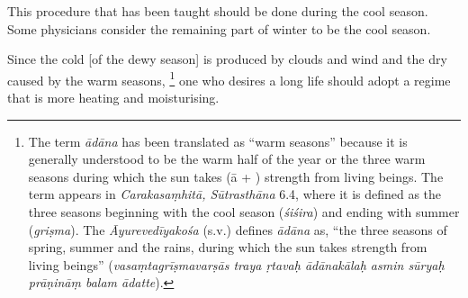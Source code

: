 \begin{translation}
\item[36] %
This procedure %
that has been taught should be done during the cool season. %
Some physicians consider the remaining part of winter to be the cool season. 

\item[37] %

Since the cold [of the dewy season] is produced by clouds and wind and the dry caused by the warm seasons,%
	\footnote{The term \emph{ādāna} has been translated as ``warm 
	seasons'' because it is generally understood to be the warm half of the 
	year or the three warm seasons during which the sun takes (ā +  
	) strength from living beings. The term appears in 
	\emph{Carakasaṃhitā, Sūtrasthāna} 6.4, where it is defined as the three 
	seasons beginning with the cool season (\emph{śiśira}) and ending with 
	summer (\emph{griṣma}). The  \emph{Āyurevedīyakośa} (s.v.) defines 
	\emph{ādāna} as, ``the three seasons of spring, summer and the rains, 
	during which the sun takes strength from living beings''  
	(\emph{vasaṃtagrīṣmavarṣās traya ṛtavaḥ ādānakālaḥ asmin sūryaḥ 
	prāṇināṃ balam ādatte}).}
one who desires a long life should adopt a regime that is more heating and moisturising. 	


\end{translation}
